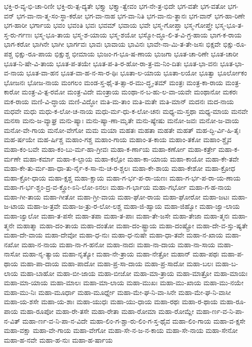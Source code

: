 {ಭಕ್ತಿ-ರ-ವ್ಯ-ಭಿ-ಚಾ-ರಿಣೀ
ಭಕ್ತಿ-ರು-ತ್ಪ-ದ್ಯತೇ
ಭಕ್ತ್ಯಾ
ಭಕ್ತ್ಯಾ-ತ್ವೇವಂ
ಭಗ-ನೇ-ತ್ರ-ಭಿದೇ
ಭಗ-ವತೇ
ಭಗ-ವತೋ
ಭಗ-ವನ್
ಭಗ-ವಾ-ನಾ-ತ್ಮ-ಸಂ-ಸ್ಥಾ-ಕರೋ
ಭಗ-ವಾ-ನಾಹ
ಭಗ-ವಾ-ನಿತಿ
ಭಗ-ವಾ-ನು-ತ್ಥಾನಃ
ಭಗ-ವಾನ್
ಭಗ-ಹಾ-ರಿಣೇ
ಭಗ-ಹಾರೀ
ಭರ್ಗಾಯ
ಭವಂ
ಭವಂತಿ
ಭವಃ
ಭವಮ್
ಭವಾಯ
ಭವೇ
ಭಸ್ಮ-ಗೋಪ್ತಾ
ಭಸ್ಮ-ಗೋಪ್ತ್ರೇ
ಭಸ್ಮ-ಭೂ-ತ-ಸ್ತ-ರು-ರ್ಗಣಃ
ಭಸ್ಮ-ಭೂ-ತಾಯ
ಭಸ್ಮ-ಶ-ಯಾಯ
ಭಸ್ಮ-ಶಯೋ
ಭಸ್ಮೋ-ದ್ಧೂ-ಲಿ-ತ-ವಿ-ಗ್ರ-ಹಾಯ
ಭಾಗ-ಕ-ರಾಯ
ಭಾಗ-ಕರೋ
ಭಾಗಿನೇ
ಭಾಗೀ
ಭಾರ್ಗವಃ
ಭಾವಃ
ಭಾವಾಯ
ಭಾವಿನಃ
ಭಾವೇ-ನಾ-ಮಿ-ತ-ತೇ-ಜಸಃ
ಭಿಕ್ಷವೇ
ಭಿಕ್ಷು-ರೂ-ಪಶ್ಚ
ಭಿಕ್ಷು-ರೂ-ಪಾಯ
ಭಿಕ್ಷುಶ್ಚ
ಭೀಮಾಯ
ಭುಜಂ-ಗ-ಭೂ-ಷ-ಣಾಯ
ಭುಜಗಾ
ಭೂತ-ಚಾ-ರಿಣೇ
ಭೂತ-ಚಾರೀ
ಭೂತ-ನಿ-ಷೇ-ವಿ-ತಾಯ
ಭೂತ-ಪ-ತಯೇ
ಭೂತ-ಪ-ತಿ-ರ-ಹೋ-ರಾ-ತ್ರ-ಮ-ನಿಂ-ದಿತಃ
ಭೂತ-ಭಾ-ವನಃ
ಭೂತ-ಭಾ-ವ-ನಾಯ
ಭೂತ-ವಾ-ಹನ
ಭೂತ-ವಾ-ಹ-ನ-ಸಾ-ರ-ಥಿಃ
ಭೂತಾ-ಲ-ಯಾಯ
ಭೂತಾ-ಲಯೋ
ಭೂತ್ವಾ
ಭೂರ್ಲೋಕಂ
ಭೋಜನಃ
ಭೋಜ-ನಾಯ
ಮಂಗಲಂ
ಮಂಡ-ಸ್ತ-ಥೈ-ತ-ತ್ಸಾ-ರ-ಮು-ದ್ಧೃ-ತಮ್
ಮಂತ್ರಃ
ಮಂತ್ರ-ಕಾ-ರಾಯ
ಮಂತ್ರ-ಕಾರೋ
ಮಂತ್ರ-ವಿ-ತ್ಪ-ರಮೋ
ಮಂತ್ರ-ವಿದೇ
ಮಂತ್ರಾಯ
ಮಂಥಾ-ನ-ಬ-ಹು-ಲ-ವಾ-ಯವೇ
ಮಂಥಾನೋ
ಮಕರಃ
ಮಕ-ರಾಯ
ಮಣಿ-ವಿ-ದ್ಧಾಯ
ಮಣಿ-ವಿದ್ಧೋ
ಮತಿ-ಮ-ತಾಂ
ಮತಿ-ಮತೇ
ಮತಿ-ಮಾನ್
ಮದನಃ
ಮದ-ನಾಯ
ಮಧವೇ
ಮಧು
ಮಧು-ಕ-ಲೋ-ಚ-ನಾಯ
ಮಧು-ರ್ಮ-ಧು-ಕ-ಲೋ-ಚನಃ
ಮಧ್ಯ-ಮ-ಸ್ತಥಾ
ಮಧ್ಯ-ಮಾಯ
ಮನವೇ
ಮನಸಾ
ಮನು-ಜ-ವ್ಯಾಘ್ರ
ಮನು-ಷ್ಯಾಃ
ಮನು-ಷ್ಯಾ-ಣಾ-ಮೃತೇ
ಮನು-ಷ್ಯೇಷು
ಮನೋ-ಜವಃ
ಮನೋ-ಜ-ವಾಯ
ಮನೋ-ವೇ-ಗಾಯ
ಮನೋ-ವೇಗೋ
ಮಮ
ಮಯಾ
ಮಹತಃ
ಮಹತಾ
ಮಹತೇ
ಮಹತ್
ಮಹ-ದ್ಭಿ-ರ್ವಿ-ಹಿ-ತೈಃ
ಮಹ-ರ್ಷಯೇ
ಮಹ-ರ್ಷಿಶ್ಚ
ಮಹಾಂ-ಗಶ್ಚ
ಮಹಾಂ-ಗಾಯ
ಮಹಾಂ-ತ-ಕಾಯ
ಮಹಾಂ-ತಕೋ
ಮಹಾಂ-ಶ್ಚೈವ
ಮಹಾ-ಕಂ-ಬವೇ
ಮಹಾ-ಕಂ-ಬು-ರ್ಮ-ಹಾ-ಗ್ರೀವಃ
ಮಹಾ-ಕ-ರ್ಣಾಯ
ಮಹಾ-ಕರ್ಣೋ
ಮಹಾ-ಕರ್ತ್ರೇ
ಮಹಾ-ಕ-ರ್ಮಣೇ
ಮಹಾ-ಕರ್ಮಾ
ಮಹಾ-ಕ-ಲ್ಪಾಯ
ಮಹಾ-ಕಲ್ಪೋ
ಮಹಾ-ಕಾ-ಯಾಯ
ಮಹಾ-ಕಾಯೋ
ಮಹಾ-ಕೇ-ತವೇ
ಮಹಾ-ಕೇ-ತು-ರ್ಮ-ಹಾ-ಧಾ-ತು-ರ್ನೈ-ಕ-ಸಾ-ನು-ಚ-ರ-ಶ್ಚಲಃ
ಮಹಾ-ಕೇ-ಶಾಯ
ಮಹಾ-ಕೇಶೋ
ಮಹಾ-ಕ್ರೋಧ
ಮಹಾ-ಕ್ರೋ-ಧಾಯ
ಮಹಾ-ಕ್ಷಶ್ಚ
ಮಹಾ-ಕ್ಷಾಯ
ಮಹಾ-ಗ-ರ್ಭ-ಪ-ರಾ-ಯಣಃ
ಮಹಾ-ಗ-ರ್ಭ-ಪ-ರಾ-ಯ-ಣಾಯ
ಮಹಾ-ಗ-ರ್ಭ-ಶ್ಚಂ-ದ್ರ-ವ-ಕ್ತ್ರೋ-ಽನಿ-ಲೋ-ಽನಲಃ
ಮಹಾ-ಗ-ರ್ಭಾಯ
ಮಹಾ-ಗರ್ಭೋ
ಮಹಾ-ಗ-ಹ-ನಾಯ
ಮಹಾ-ಗೀ-ತಾಯ
ಮಹಾ-ಗೀತೋ
ಮಹಾ-ಗ್ರೀ-ವಾಯ
ಮಹಾ-ಘೋ-ರಾಯ
ಮಹಾ-ಘೋರೋ
ಮಹಾ-ಜಟಃ
ಮಹಾ-ಜ-ಟಾಯ
ಮಹಾ-ಜ-ತ್ರವೇ
ಮಹಾ-ಜ-ತ್ರು-ರ-ಲೋ-ಲಶ್ಚ
ಮಹಾ-ಜಿ-ಹ್ವಾಯ
ಮಹಾ-ಜಿಹ್ವೋ
ಮಹಾ-ಜ್ವಾ-ಲಾಯ
ಮಹಾ-ಜ್ವಾಲೋ
ಮಹಾ-ತ-ಪಸೇ
ಮಹಾ-ತಪಾ
ಮಹಾ-ತ-ಪಾಃ
ಮಹಾ-ತೇ-ಜಸೇ
ಮಹಾ-ತೇಜಾ
ಮಹಾ-ತ್ಮನಃ
ಮಹಾ-ತ್ಮನೇ
ಮಹಾತ್ಮಾ
ಮಹಾ-ದಂ-ತಾಯ
ಮಹಾ-ದಂತೋ
ಮಹಾ-ದಂ-ಷ್ಟ್ರಾಯ
ಮಹಾ-ದಂಷ್ಟ್ರೋ
ಮಹಾ-ದೇ-ವ-ಸ್ತು-ಷ್ಯತೇ
ಮಹಾ-ದೇ-ವಾಯ
ಮಹಾ-ದೇವೋ
ಮಹಾ-ಧ-ನುಃ
ಮಹಾ-ಧ-ನುಷೇ
ಮಹಾ-ಧಾ-ತವೇ
ಮಹಾ-ನ-ಖಾಯ
ಮಹಾ-ನಖೋ
ಮಹಾ-ನ-ನಾಯ
ಮಹಾ-ನಾ-ಗ-ಹನೋ
ಮಹಾ-ನಾದಃ
ಮಹಾ-ನಾ-ದಾಯ
ಮಹಾ-ನಾ-ಸಾಯ
ಮಹಾ-ನಾಸೋ
ಮಹಾ-ನೃ-ತ್ಯಾಯ
ಮಹಾ-ನೃತ್ಯೋ
ಮಹಾ-ನೇ-ತ್ರಾಯ
ಮಹಾ-ನೇತ್ರೋ
ಮಹಾನ್
ಮಹಾ-ಪಥಃ
ಮಹಾ-ಪ-ಥಾಯ
ಮಹಾ-ಪಾ-ದಾಯ
ಮಹಾ-ಪಾದೋ
ಮಹಾ-ಪ್ರ-ಸಾ-ದಾಯ
ಮಹಾ-ಪ್ರ-ಸಾದೋ
ಮಹಾ-ಬಲಃ
ಮಹಾ-ಬ-ಲಾಯ
ಮಹಾ-ಬಾಹೋ
ಮಹಾ-ಬೀ-ಜಾಯ
ಮಹಾ-ಬೀಜೋ
ಮಹಾ-ಮಾ-ತ್ರಾಯ
ಮಹಾ-ಮಾತ್ರೋ
ಮಹಾ-ಮಾಯಃ
ಮಹಾ-ಮಾ-ಯಾಯ
ಮಹಾ-ಮಾಲಃ
ಮಹಾ-ಮಾ-ಲಾಯ
ಮಹಾ-ಮುಖಃ
ಮಹಾ-ಮು-ಖಾಯ
ಮಹಾ-ಮು-ನಯೇ
ಮಹಾ-ಮು-ನಿಃ
ಮಹಾ-ಮೂರ್ಧಾ
ಮಹಾ-ಮೂರ್ಧ್ನೇ
ಮಹಾ-ಮೇ-ಘ-ನಿ-ವಾ-ಸಿನೇ
ಮಹಾ-ಮೇ-ಘ-ನಿ-ವಾಸೀ
ಮಹಾ-ಯ-ಶಸೇ
ಮಹಾ-ಯ-ಶಾಃ
ಮಹಾ-ಯುಧಃ
ಮಹಾ-ಯು-ಧಾಯ
ಮಹಾ-ರಥಃ
ಮಹಾ-ರ-ಥಾಯ
ಮಹಾ-ರೂ-ಪಾಯ
ಮಹಾ-ರೂಪೋ
ಮಹಾ-ರೇ-ತಸೇ
ಮಹಾ-ರೇತಾ
ಮಹಾ-ರೋಮಾ
ಮಹಾ-ರೋಮ್ಣೇ
ಮಹಾ-ರ್ಣ-ವ-ನಿ-ಪಾ-ನ-ವಿತ್
ಮಹಾ-ರ್ಣ-ವ-ನಿ-ಪಾ-ನ-ವಿದೇ
ಮಹಾ-ಲಿಂ-ಗ-ಶ್ಚಾ-ರು-ಲಿಂ-ಗ-ಸ್ತ-ಥೈವ
ಮಹಾ-ಲಿಂ-ಗಾಯ
ಮಹಾ-ವ-ಕ್ಷಸೇ
ಮಹಾ-ವಕ್ಷಾ
ಮಹಾ-ವೇ-ಗಾಯ
ಮಹಾ-ವೇಗೋ
ಮಹಾ-ಸೇ-ನ-ಜ-ನ-ಕಾಯ
ಮಹಾ-ಸೇ-ನಾಯ
ಮಹಾ-ಸೇನೋ
ಮಹಾ-ಹ-ನವೇ
ಮಹಾ-ಹ-ನುಃ
ಮಹಾ-ಹ-ರ್ಷಾಯ
}
